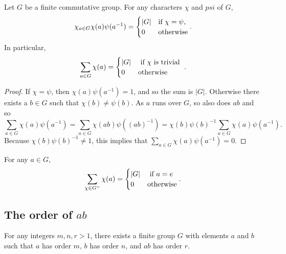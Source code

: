\begin{theorem}
  Let \( G \) be a finite commutative group.
  For any characters \( \chi \) and \( psi \) of \( G \),
  \[
    \chi_{a \in G} \chi(a) \psi(a^{-1}) =
    \begin{cases}
      \left\vert G \right\vert & \textmd{if } \chi = \psi,\\
      0 &\textmd{otherwise}
    \end{cases}.
  \]
  In particular,
  \[
    \sum_{a \in G} \chi(a) = \begin{cases}
      \left\vert G \right\vert & \textmd{ if } \chi \textmd{ is trivial }\\
      0 & \textmd{otherwise}
    \end{cases}.
  \]
\end{theorem}
\begin{proof}
  If \( \chi = \psi \), then \( \chi(a) \psi(a^{-1}) = 1 \), and so the sum is
  \( \left\vert G \right\vert \). Otherwise there exists a \( b \in G \) such
  that \( \chi(b) \neq \psi(b) \). As \( a \) runs over \( G \), so also does \(
  ab \) and so
  \[
    \sum_{a \in G} \chi(a) \psi(a^{-1}) = \sum_{a \in G} \chi(ab)
    \psi((ab)^{-1}) = \chi(b)\psi(b)^{-1}\sum_{a \in G}\chi(a)\psi(a^{-1}).
  \]
  Because \( \chi(b)\psi(b)^{-1} \neq 1 \), this implies that \( \sum_{a \in G}
  \chi(a) \psi(a^{-1}) = 0 \).
\end{proof}

\begin{corollary}
  For any \( a \in G \),
  \[
    \sum_{\chi \in G^{\vee}} \chi(a) = \begin{cases}
      \left\vert G \right\vert & \textmd{ if } a = e\\
      0 &\textmd{otherwise}
    \end{cases}.
  \]
\end{corollary}

\subsection{The order of \texorpdfstring{\( ab \)}{ab}}

\begin{theorem}
  For any integers \( m, n, r > 1 \), there exists a finite group \( G \) with
  elements \( a \) and \( b \) such that \( a \) has order \( m \), \( b \) has
  order \( n \), and \( ab \) has order \( r \).
\end{theorem}

